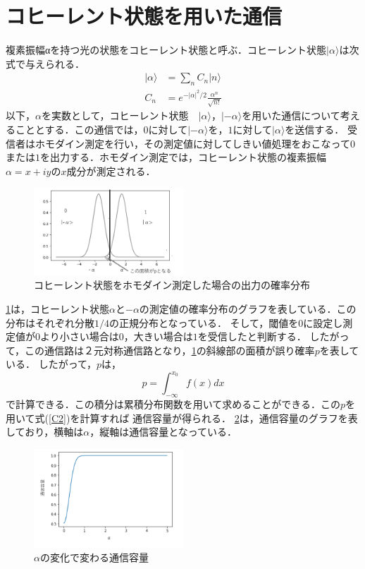 \documentclass[a4j,twocolumn]{jarticle}
\def \figref #1{\figurename\ref{#1}}
\begin{document}
\section{コヒーレント状態を用いた通信}\label{cohTrns}
複素振幅αを持つ光の状態をコヒーレント状態と呼ぶ．コヒーレント状態$|\alpha\rangle$は次式で与えられる．
\begin{equation}
\begin{split}
|\alpha\rangle&=\sum_nC_n|n\rangle \\
C_n&=e^{-|\alpha|^2/2}\frac{\alpha^n}{\sqrt{n!}}
\end{split}
\end{equation}
以下，$\alpha$を実数として，コヒーレント状態　$|\alpha\rangle$，$|-\alpha\rangle$を用いた通信について考えることとする．この通信では，$0$に対して$|-\alpha\rangle$を，$1$に対して$|\alpha\rangle$を送信する．
受信者はホモダイン測定を行い，その測定値に対してしきい値処理をおこなって$0$または$1$を出力する．ホモダイン測定では，コヒーレント状態の複素振幅$\alpha=x+iy$の$x$成分が測定される．
    \begin{figure}[H]
        \centering   
        \includegraphics[width=0.5\textwidth]{img/Fig3.png}
        \caption[sample image (png)]{コヒーレント状態をホモダイン測定した場合の出力の確率分布}
        \label{Fig4_1}
    \end{figure}
\figref{Fig4_1}は，コヒーレント状態$\alpha$と$-\alpha$の測定値の確率分布のグラフを表している．この分布はそれぞれ分散$1/4$の正規分布となっている．
そして，閾値を$0$に設定し測定値が$0$より小さい場合は$0$，大きい場合は$1$を受信したと判断する．
したがって，この通信路は２元対称通信路となり，\figref{Fig4_1}の斜線部の面積が誤り確率$p$を表している．
したがって，$p$は，
$$
p=\int_{-\infty}^{x_0}f(x)dx
$$
で計算できる．この積分は累積分布関数を用いて求めることができる．この$p$を用いて式(\ref{C2})を計算すれば
通信容量が得られる．
\figref{Fig4_3}は，通信容量のグラフを表しており，横軸は$\alpha$，縦軸は通信容量となっている．
  \begin{figure}[H]     
  \centering   
  \includegraphics[width=0.5\textwidth]{img/Fig5.png}
\caption[sample image (png)]{$\alpha$の変化で変わる通信容量}     \label{Fig4_3}
\end{figure}
\end{document}
